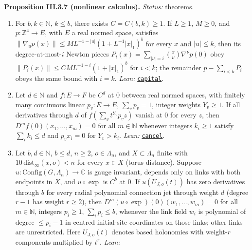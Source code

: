 \documentclass[
  letterpaper,
  11pt]{article}
\begin{document}
\textbf{Proposition III.3.7 (nonlinear calculus).} \emph{Status:}
theorems.

\begin{enumerate}
\def\labelenumi{(\alph{enumi})}
\item
  For \(b,k\in\mathbb N\), \(k\le b\), there exists \(C=C(b,k)\ge1\). If
  \(L\ge1\), \(M\ge0\), and \(p:\mathbb Z^4\to E\), with \(E\) a real
  normed space, satisfies
  \(\|\nabla_up(x)\|\le ML^{-1-|u|}(1+L^{-1}|x|_1)^b\) for every \(x\)
  and \(|u|\le k\), then its degree-at-most-\(i\) Newton pieces
  \(P_i(x)=\sum_{|\nu|=i}\binom{x}{\nu}\nabla^\nu p(0)\) obey
  \(\|P_i(x)\|\le CML^{-1-i}(1+|x|_1)^b\) for \(i<k\); the remainder
  \(p-\sum_{i<k}P_i\) obeys the same bound with \(i=k\). \emph{Lean:}
  \href{https://github.com/yang-mills-group/OpenAI-YM-20261028/blob/3456e5e75cf8d4cd558955a5c7638fba2d68f464/YM/MultiNext/SIGNED_SOURCE_CONTINUATION/TownHall.lean\#L31-L90}{\texttt{capital}}.
\item
  Let \(d\in\mathbb N\) and \(f:E\to F\) be \(C^d\) at \(0\) between
  real normed spaces, with finitely many continuous linear
  \(p_v:E\to E\), \(\sum_vp_v=1\), integer weights \(Y_v\ge1\). If all
  derivatives through \(d\) of \(f(\sum_vt^{Y_v}p_vz)\) vanish at \(0\)
  for every \(z\), then \(D^mf(0)(x_1,\ldots,x_m)=0\) for all
  \(m\in\mathbb N\) whenever integers \(k_i\ge1\) satisfy
  \(\sum_i k_i\le d\) and \(p_vx_i=0\) for \(Y_v>k_i\). \emph{Lean:}
  \href{https://github.com/yang-mills-group/OpenAI-YM-20261028/blob/3456e5e75cf8d4cd558955a5c7638fba2d68f464/YM/MultiNext/SIGNED_SOURCE_CONTINUATION/Weighted.lean\#L120-L147}{\texttt{cancel}}.
\item
  Let \(b,d\in\mathbb N\), \(b\le d\), \(n\ge2\), \(o\in\Lambda_n\), and
  \(X\subset\Lambda_n\) finite with \(10\,\mathrm{dist}_\infty(x,o)<n\)
  for every \(x\in X\) (torus distance). Suppose
  \(u:\mathrm{Config}(G,\Lambda_n)\to\mathbb C\) is gauge invariant,
  depends only on links with both endpoints in \(X\), and \(u\circ\exp\)
  is \(C^b\) at \(0\). If \(u(U_{J,o}(t))\) has zero derivatives through
  \(b\) for every radial polynomial connection jet through weight \(d\)
  (degree \(r-1\) has weight \(r\ge2\)), then
  \(D^m(u\circ\exp)(0)(w_1,\ldots,w_m)=0\) for all \(m\in\mathbb N\),
  integers \(p_i\ge1\), \(\sum_i p_i\le b\), whenever the link field
  \(w_i\) is polynomial of degree \(\le p_i-1\) in centred initial-site
  coordinates on those links; other links are unrestricted. Here
  \(U_{J,o}(t)\) denotes based holonomies with weight-\(r\) components
  multiplied by \(t^r\). \emph{Lean:}

\end{enumerate}
\end{document}
